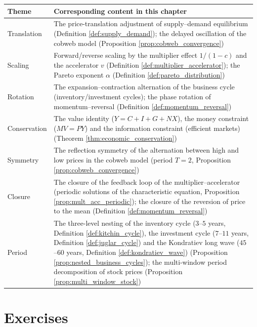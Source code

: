 \begin{center}
\begin{tabular}{>{\centering\arraybackslash}p{2.8cm}>{\centering\arraybackslash}p{9.9cm}}
\toprule
Theme & Corresponding content in this chapter \\
\midrule
Translation & The price-translation adjustment of supply--demand equilibrium (Definition \ref{def:supply_demand}); the delayed oscillation of the cobweb model (Proposition \ref{prop:cobweb_convergence}) \\
Scaling & Forward/reverse scaling by the multiplier effect $1/(1-c)$ and the accelerator $v$ (Definition \ref{def:multiplier_accelerator}); the Pareto exponent $\alpha$ (Definition \ref{def:pareto_distribution}) \\
Rotation & The expansion--contraction alternation of the business cycle (inventory/investment cycles); the phase rotation of momentum--reversal (Definition \ref{def:momentum_reversal}) \\
Conservation & The value identity ($Y=C+I+G+NX$), the money constraint ($MV=PY$) and the information constraint (efficient markets) (Theorem \ref{thm:economic_conservation}) \\
Symmetry & The reflection symmetry of the alternation between high and low prices in the cobweb model (period $T=2$, Proposition \ref{prop:cobweb_convergence}) \\
Closure & The closure of the feedback loop of the multiplier--accelerator (periodic solutions of the characteristic equation, Proposition \ref{prop:mult_acc_periodic}); the closure of the reversion of price to the mean (Definition \ref{def:momentum_reversal}) \\
Period & The three-level nesting of the inventory cycle ($3$--$5$ years, Definition \ref{def:kitchin_cycle}), the investment cycle ($7$--$11$ years, Definition \ref{def:juglar_cycle}) and the Kondratiev long wave ($45$--$60$ years, Definition \ref{def:kondratiev_wave}) (Proposition \ref{prop:nested_business_cycles}); the multi-window period decomposition of stock prices (Proposition \ref{prop:multi_window_stock}) \\
\bottomrule
\end{tabular}
\end{center}

\section*{Exercises}

